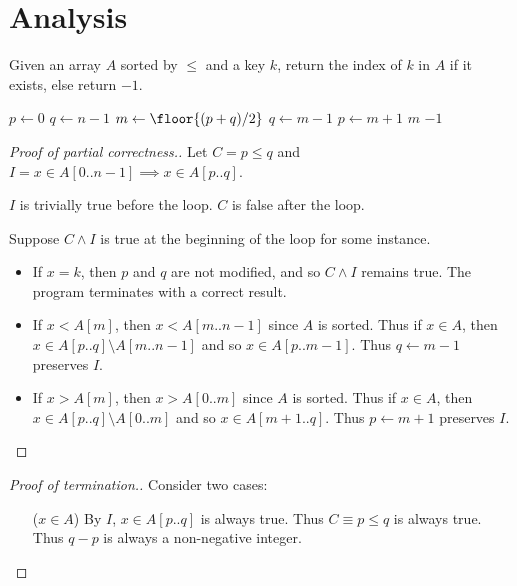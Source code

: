 \section{Analysis} \label{sec:analysis}
\begin{problem} \label{prob:binary_search}
    Given an array $A$ sorted by $\leq$ and a key $k$, return the index of $k$
    in $A$ if it exists, else return $-1$.
\end{problem}
\begin{solution} \leavevmode
    \begin{algorithm}
        \begin{algorithmic}[1]
                \State $p \gets 0$
                \State $q \gets n - 1$
                    \State $m \gets \floor{(p + q) / 2}$
                        \State $q \gets m - 1$
                        \State $p \gets m + 1$
                    \Else
                        \State \Return $m$
                    \EndIf
                \EndWhile
                \State \Return $-1$
            \EndFunction
        \end{algorithmic}
    \end{algorithm}

    \begin{proof}
        [Proof of partial correctness.]
        Let $C = p \leq q$ and $I = x \in A[0..n-1] \implies x \in A[p..q]$.

        $I$ is trivially true before the loop.
        $C$ is false after the loop.

        Suppose $C \land I$ is true at the beginning of the loop for some
        instance.
        \begin{itemize}
            \item If $x = k$, then $p$ and $q$ are not modified, and so
                $C \land I$ remains true.
                The program terminates with a correct result.
            \item If $x < A[m]$, then $x < A[m..n-1]$ since $A$ is sorted.
                Thus if $x \in A$, then $x \in A[p..q] \setminus A[m..n-1]$ and
                so $x \in A[p..m-1]$.
                Thus $q \gets m-1$ preserves $I$.
            \item If $x > A[m]$, then $x > A[0..m]$ since $A$ is sorted.
                Thus if $x \in A$, then $x \in A[p..q] \setminus A[0..m]$ and
                so $x \in A[m+1..q]$.
                Thus $p \gets m+1$ preserves $I$. \qedhere
        \end{itemize}
    \end{proof}
    \begin{proof}
        [Proof of termination.]
        Consider two cases:
        \begin{enumerate}
            \item[($x \in A$)] By $I$, $x \in A[p..q]$ is always true.
                Thus $C \equiv p \leq q$ is always true.
                Thus $q - p$ is always a non-negative integer.


\end{enumerate}
\end{proof}
\end{solution}

